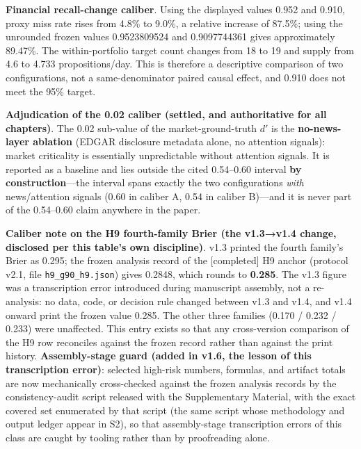 \documentclass[
  11pt]{article}
\begin{document}
\textbf{Financial recall-change caliber}. Using the displayed values
0.952 and 0.910, proxy miss rate rises from 4.8\% to 9.0\%, a relative
increase of 87.5\%; using the unrounded frozen values 0.9523809524 and
0.9097744361 gives approximately 89.47\%. The within-portfolio target
count changes from 18 to 19 and supply from 4.6 to 4.733
propositions/day. This is therefore a descriptive comparison of two
configurations, not a same-denominator paired causal effect, and 0.910
does not meet the 95\% target.

\textbf{Adjudication of the 0.02 caliber (settled, and authoritative for
all chapters)}. The 0.02 sub-value of the market-ground-truth \(d'\) is
the \textbf{no-news-layer ablation} (EDGAR disclosure metadata alone, no
attention signals): market criticality is essentially unpredictable
without attention signals. It is reported as a baseline and lies outside
the cited 0.54--0.60 interval \textbf{by construction}---the interval
spans exactly the two configurations \emph{with} news/attention signals
(0.60 in caliber A, 0.54 in caliber B)---and it is never part of the
0.54--0.60 claim anywhere in the paper.

\textbf{Caliber note on the H9 fourth-family Brier (the v1.3→v1.4
change, disclosed per this table's own discipline)}. v1.3 printed the
fourth family's Brier as 0.295; the frozen analysis record of the
{[}completed{]} H9 anchor (protocol v2.1, file
\texttt{h9\_g90\_h9.json}) gives 0.2848, which rounds to \textbf{0.285}.
The v1.3 figure was a transcription error introduced during manuscript
assembly, not a re-analysis: no data, code, or decision rule changed
between v1.3 and v1.4, and v1.4 onward print the frozen value 0.285. The
other three families (0.170 / 0.232 / 0.233) were unaffected. This entry
exists so that any cross-version comparison of the H9 row reconciles
against the frozen record rather than against the print history.
\textbf{Assembly-stage guard (added in v1.6, the lesson of this
transcription error)}: selected high-risk numbers, formulas, and
artifact totals are now mechanically cross-checked against the frozen
analysis records by the consistency-audit script released with the
Supplementary Material, with the exact covered set enumerated by that
script (the same script whose methodology and output ledger appear in
S2), so that assembly-stage transcription errors of this class are
caught by tooling rather than by proofreading alone.
\end{document}
